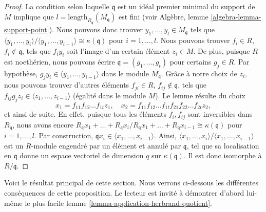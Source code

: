 \begin{proof}
La condition selon laquelle $\mathfrak q$ est un idéal premier minimal du support
de $M$ implique que $l = \text{length}_{R_\mathfrak q}(M_\mathfrak q)$
est fini (voir Algèbre, lemme \ref{algebra-lemma-support-point}).
Nous pouvons donc trouver $y_1, \ldots, y_l \in M_{\mathfrak q}$
tels que
$\langle y_1, \ldots, y_i\rangle / \langle y_1, \ldots, y_{i - 1}\rangle
\cong \kappa(\mathfrak q)$ pour $i = 1, \ldots, l$.
Nous pouvons trouver $f_i \in R$, $f_i \not \in \mathfrak q$, tels que
$f_i y_i$ soit l'image d'un certain élément $z_i \in M$.
De plus, puisque $R$ est noethérien, nous pouvons écrire
$\mathfrak q = (g_1, \ldots, g_t)$ pour certains $g_j \in R$.
Par hypothèse, $g_j y_i \in \langle y_1, \ldots, y_{i - 1} \rangle$
dans le module $M_{\mathfrak q}$.
Grâce à notre choix de $z_i$, nous pouvons trouver d'autres éléments
$f_{ji} \in R$, $f_{ij} \not \in \mathfrak q$, tels que
$f_{ij} g_j z_i \in \langle z_1, \ldots, z_{i - 1} \rangle$
(égalité dans le module $M$).
Le lemme résulte du choix
$$
x_1 = f_{11}f_{12}\ldots f_{1t}z_1,
\quad
x_2 = f_{11}f_{12}\ldots f_{1t}f_{21}f_{22}\ldots f_{2t}z_2,
$$
et ainsi de suite. En effet, puisque tous les éléments $f_i, f_{ij}$ sont inversibles
dans $R_{\mathfrak q}$, nous avons encore
$R_{\mathfrak q}x_1 + \ldots + R_{\mathfrak q}x_i /
R_{\mathfrak q}x_1 + \ldots + R_{\mathfrak q}x_{i - 1}
\cong \kappa(\mathfrak q)$ pour $i = 1, \ldots, l$.
Par construction, $\mathfrak q x_i \in \langle x_1, \ldots, x_{i - 1}\rangle$.
Ainsi, $\langle x_1, \ldots, x_i\rangle / \langle x_1, \ldots, x_{i - 1}\rangle$
est un $R$-module engendré par un élément et annulé par $\mathfrak q$,
tel que sa localisation en $\mathfrak q$ donne un espace vectoriel de dimension $q$
sur $\kappa(\mathfrak q)$.
Il est donc isomorphe à $R/\mathfrak q$.
\end{proof}

\noindent
Voici le résultat principal de cette section.
Nous verrons ci-dessous les différentes
conséquences de cette proposition.
Le lecteur est invité à démontrer d'abord lui-même le plus facile
lemme \ref{lemma-application-herbrand-quotient}.

